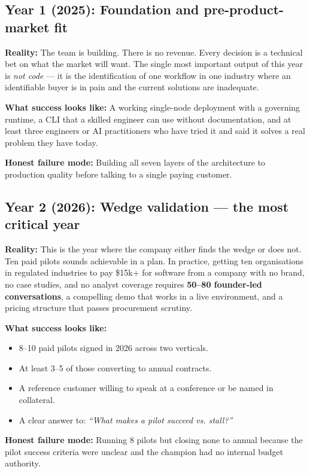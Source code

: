 \subsection{Year 1 (2025): Foundation and pre-product-market fit}

\textbf{Reality:} The team is building. There is no revenue. Every decision
is a technical bet on what the market will want. The single most important
output of this year is \textit{not code} — it is the identification of one
workflow in one industry where an identifiable buyer is in pain and the current
solutions are inadequate.

\textbf{What success looks like:} A working single-node deployment with a
governing runtime, a CLI that a skilled engineer can use without documentation,
and at least three engineers or AI practitioners who have tried it and said it
solves a real problem they have today.

\textbf{Honest failure mode:} Building all seven layers of the architecture to
production quality before talking to a single paying customer.

\subsection{Year 2 (2026): Wedge validation — the most critical year}

\textbf{Reality:} This is the year where the company either finds the wedge or
does not. Ten paid pilots sounds achievable in a plan. In practice, getting ten
organisations in regulated industries to pay \$15k+ for software from a company
with no brand, no case studies, and no analyst coverage requires \textbf{50--80
founder-led conversations}, a compelling demo that works in a live environment,
and a pricing structure that passes procurement scrutiny.

\textbf{What success looks like:}
\begin{itemize}[leftmargin=1.5em,itemsep=2pt]
  \item 8--10 paid pilots signed in 2026 across two verticals.
  \item At least 3--5 of those converting to annual contracts.
  \item A reference customer willing to speak at a conference or be named in
        collateral.
  \item A clear answer to: \textit{``What makes a pilot succeed vs. stall?''}
\end{itemize}

\textbf{Honest failure mode:} Running 8 pilots but closing none to annual
because the pilot success criteria were unclear and the champion had no internal
budget authority.

